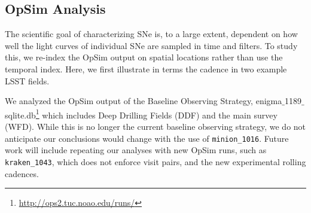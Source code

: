 



\subsection{OpSim Analysis}
\label{sec:\secname:analysis}
The scientific goal of characterizing SNe is, to a large extent, dependent
on how well the light curves of individual SNe are sampled in time and
filters. To study this, we re-index the OpSim output on spatial
locations rather than use the temporal index. Here, we first illustrate
in terms the cadence in two example LSST fields.












We analyzed the OpSim output of the Baseline Observing Strategy,
enigma$\_$1189$\_$sqlite.db{\footnote
{\url{http://ops2.tuc.noao.edu/runs/}}} which includes Deep Drilling
Fields (DDF) and the main survey (WFD). While this is no longer the current baseline observing
strategy, we do not anticipate our conclusions would change with the use of
\texttt{minion\_1016}. Future work will include repeating our analyses with new OpSim runs, such as
\texttt{kraken\_1043}, which does not enforce visit pairs, and the new experimental rolling
cadences.

